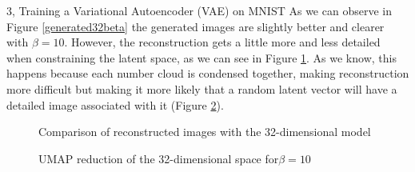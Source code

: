 \begin{task}{3, Training a Variational Autoencoder (VAE) on MNIST}
As we can observe in Figure \ref{generated32beta} the generated images are slightly better and clearer with \(\beta = 10\). However, the reconstruction gets a little more  and less detailed when constraining the latent space, as we can see in Figure \ref{rec32dbeta}. As we know, this happens because each number cloud is condensed together, making reconstruction more difficult but making it more likely that a random latent vector will have a detailed image associated with it (Figure \ref{latent32beta}).

\begin{figure}[H]
    \centering
    \caption{Comparison of reconstructed images with the 32-dimensional model}
    \label{rec32dbeta}
\end{figure}

\begin{figure}[H]
    \centering
    \caption{UMAP reduction of the 32-dimensional space for\(\beta = 10\)}
    \label{latent32beta}
\end{figure}


\end{task}
